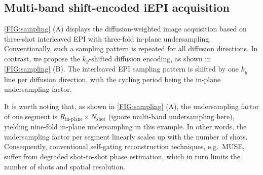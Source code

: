 \documentclass[preprint,12pt,authoryear,review]{elsarticle}
\begin{document}
    \subsection{Multi-band shift-encoded iEPI acquisition}

    \cref{FIG:sampling} (A) displays the diffusion-weighted image
    acquisition based on three-shot interleaved EPI
    with three-fold in-plane undersampling.
    Conventionally, such a sampling pattern is repeated
    for all diffusion directions.
    In contrast, we propose the $k_y$-shifted diffusion encoding,
    as shown in \cref{FIG:sampling} (B).
    The interleaved EPI sampling pattern is shifted by one $k_y$ line
    per diffusion direction,
    with the cycling period being the in-plane undersampling factor.

    It is worth noting that, as shown in \cref{FIG:sampling} (A),
    the undersampling factor of one segment is
    $R_\text{in-plane} \times N_\mathrm{shot}$
    (ignore multi-band undersampling here),
    yielding nine-fold in-plane undersampling in this example.
    In other words, the undersampling factor per segment
    linearly scales up with the number of shots.
    Consequently, conventional self-gating reconstruction techniques,
    e.g.~MUSE, suffer from degraded shot-to-shot phase estimation,
    which in turn limits the number of shots and spatial resolution.
\end{document}
